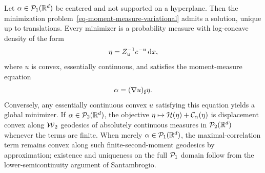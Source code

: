 \begin{prop}\label{prop-moment-hidden-convexity}
	Let $\alpha\in\mathcal{P}_1(\mathbb{R}^d)$ be centered and not supported on a hyperplane. Then the minimization problem~\eqref{eq-moment-measure-variational} admits a solution, unique up to translations. Every minimizer is a probability measure with log-concave density of the form
	\[
		\eta=Z_u^{-1}e^{-u}\,\mathrm{d} x,
	\]
	where $u$ is convex, essentially continuous, and satisfies the moment-measure equation
	\[
		\alpha=(\nabla u)_\sharp \eta.
	\]
		Conversely, any essentially continuous convex $u$ satisfying this equation yields a global minimizer. If $\alpha\in\mathcal{P}_2(\mathbb{R}^d)$, the objective $\eta\mapsto\mathcal H(\eta)+\mathcal C_\alpha(\eta)$ is displacement convex along $\operatorname{\mathcal{W}}_2$ geodesics of absolutely continuous measures in $\mathcal{P}_2(\mathbb{R}^d)$ whenever the terms are finite. When merely $\alpha\in\mathcal{P}_1(\mathbb{R}^d)$, the maximal-correlation term remains convex along such finite-second-moment geodesics by approximation; existence and uniqueness on the full $\mathcal{P}_1$ domain follow from the lower-semicontinuity argument of Santambrogio.
\end{prop}

